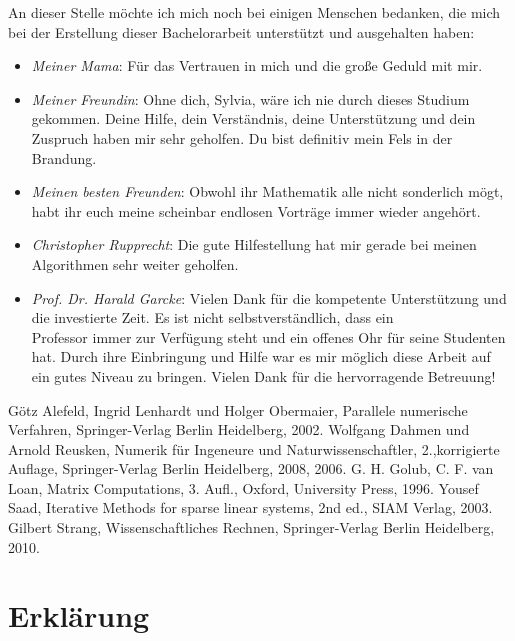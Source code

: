 \begin{large}
An dieser Stelle möchte ich mich noch bei einigen Menschen bedanken, die mich bei der Erstellung dieser Bachelorarbeit unterstützt und ausgehalten haben:
\begin{itemize}
\item \textit{Meiner Mama}: Für das Vertrauen in mich und die große Geduld mit mir.
\item \textit{Meiner Freundin}: Ohne dich, Sylvia, wäre ich nie durch dieses Studium gekommen. Deine Hilfe, dein Verständnis, deine Unterstützung und dein Zuspruch haben mir sehr geholfen. Du bist definitiv mein Fels in der Brandung.
\item \textit{Meinen besten Freunden}: Obwohl ihr Mathematik alle nicht sonderlich mögt, habt ihr euch meine scheinbar endlosen Vorträge immer wieder angehört.
\item \textit{Christopher Rupprecht}: Die gute Hilfestellung hat mir gerade bei meinen Algorithmen sehr weiter geholfen.
\item \textit{Prof. Dr. Harald Garcke}:  Vielen Dank für die kompetente Unterstützung und die investierte Zeit. Es ist nicht selbstverständlich, dass ein\\ Professor immer zur Verfügung steht und ein offenes Ohr für seine Studenten hat. Durch ihre Einbringung und Hilfe war es mir möglich diese Arbeit auf ein gutes Niveau zu bringen. Vielen Dank für die hervorragende Betreuung!
\end{itemize}
\end{large}

\begin{thebibliography}{56}

Götz Alefeld, Ingrid Lenhardt und Holger Obermaier,
Parallele numerische Verfahren,
Springer-Verlag Berlin Heidelberg,
2002.
Wolfgang Dahmen und Arnold Reusken,
Numerik für Ingeneure und Naturwissenschaftler,
2.,korrigierte Auflage,
Springer-Verlag Berlin Heidelberg,
2008, 2006.
G. H. Golub, C. F. van Loan,
Matrix Computations,
3. Aufl.,
Oxford,
University Press,
1996.
Yousef Saad,
Iterative Methods for sparse linear systems,
2nd ed.,
SIAM Verlag,
2003.
Gilbert Strang,
Wissenschaftliches Rechnen,
Springer-Verlag Berlin Heidelberg,
2010.

\end{thebibliography}


\chapter*{Erklärung}

